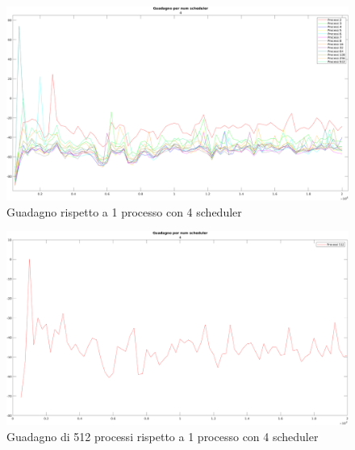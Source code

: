 \begin{figure}[!htp]
    \centering
    \includegraphics[keepaspectratio=true,scale=0.33]{images/matlab/io_guadagno/4_io_guadagno.png}
	\caption{Guadagno rispetto a 1 processo con 4 scheduler}
  	\label{fig:4_io_guadagno}
\end{figure}

\begin{figure}[!htp]
    \centering
    \includegraphics[keepaspectratio=true,scale=0.33]{images/matlab/io_guadagno/4_512_io_guadagno.png}
	\caption{Guadagno di 512 processi rispetto a 1 processo con 4 scheduler}
  	\label{fig:4_512_io_guadagno}
\end{figure}
